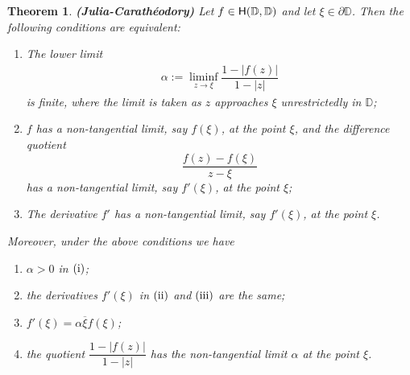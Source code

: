 \documentclass{amsart}
\newtheorem{theorem}{Theorem}[section]
\theoremstyle{definition}
\theoremstyle{remark}
\numberwithin{equation}{section}
\begin{document}
\begin{theorem}\label{Julia-Caratheodory}{\bf(Julia-Carath\'{e}odory)}
Let $f\in {\rm{\textsf{H}}}(\mathbb D, \mathbb D)$ and let $\xi\in\partial \mathbb D$. Then the following conditions are equivalent:
\begin{enumerate}
\item[(i)]  The lower limit
\begin{eqnarray}\label{def:alpha-Julia}\alpha:=\liminf\limits_{z\rightarrow \xi}\dfrac{1-|f(z)|}{1-|z|}
\end{eqnarray} is finite,
where the limit is taken as $z$ approaches $\xi$ unrestrictedly in $\mathbb D$;

\item[(ii)]  $f$ has a non-tangential limit, say $f(\xi)$, at the point $\xi$, and the difference quotient $$\frac{f(z)-f(\xi)}{z-\xi}$$ has a non-tangential limit, say $f'(\xi)$, at the point $\xi$;
\item[(iii)]  The derivative $f'$ has a non-tangential limit, say $f'(\xi)$, at the point $\xi$.
\end{enumerate}


Moreover, under the above conditions we have
\begin{enumerate}
\item[(a)]  $\alpha>0$ in $(\rm{i})$;

\item[(b)]  the   derivatives $f'(\xi)$ in $(\rm{ii})$ and $(\rm{iii})$ are the same;

\item[(c)]  $f'(\xi)=\alpha \overline{\xi}f(\xi)$;

\item[(d)]  the quotient $\dfrac{1-|f(z)|}{1-|z|}$ has the non-tangential limit $\alpha$ at the point $\xi$.
\end{enumerate}
\end{theorem}
\end{document}
